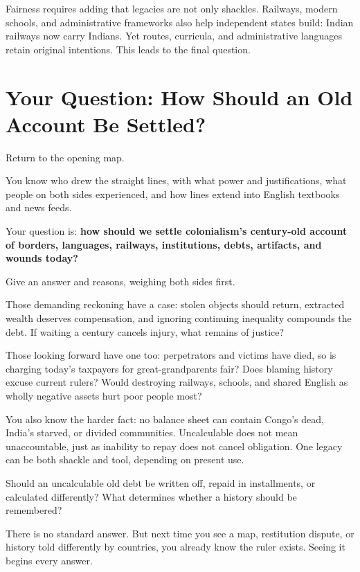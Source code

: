 Fairness requires adding that legacies are not only shackles. Railways, modern schools, and administrative frameworks also help independent states build: Indian railways now carry Indians. Yet routes, curricula, and administrative languages retain original intentions. This leads to the final question.

\section[Settling an Old Account]{Your Question: How Should an Old Account Be Settled?}
Return to the opening map.

You know who drew the straight lines, with what power and justifications, what people on both sides experienced, and how lines extend into English textbooks and news feeds.

Your question is: \textbf{how should we settle colonialism's century-old account of borders, languages, railways, institutions, debts, artifacts, and wounds today?}

Give an answer and reasons, weighing both sides first.

Those demanding reckoning have a case: stolen objects should return, extracted wealth deserves compensation, and ignoring continuing inequality compounds the debt. If waiting a century cancels injury, what remains of justice?

Those looking forward have one too: perpetrators and victims have died, so is charging today's taxpayers for great-grandparents fair? Does blaming history excuse current rulers? Would destroying railways, schools, and shared English as wholly negative assets hurt poor people most?

You also know the harder fact: no balance sheet can contain Congo's dead, India's starved, or divided communities. Uncalculable does not mean unaccountable, just as inability to repay does not cancel obligation. One legacy can be both shackle and tool, depending on present use.

Should an uncalculable old debt be written off, repaid in installments, or calculated differently? What determines whether a history should be remembered?

There is no standard answer. But next time you see a map, restitution dispute, or history told differently by countries, you already know the ruler exists. Seeing it begins every answer.
